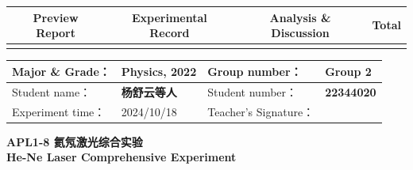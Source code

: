 


\begin{table}
	\renewcommand\arraystretch{1.7}
	\begin{tabularx}{\textwidth}{
			|X|X|X|X
			|X|X|X|X|}
		\hline
		\multicolumn{2}{|c|}{Preview Report}&\multicolumn{2}{|c|}{Experimental Record}&\multicolumn{2}{|c|}{Analysis \& Discussion}&\multicolumn{2}{|c|}{\Large\textbf{Total}}\\
		\hline
		\LARGE & & \LARGE & & \LARGE & & \LARGE & \\
		\hline
	\end{tabularx}
\end{table}


\begin{table}
	\renewcommand\arraystretch{1.7}
	\begin{tabularx}{\textwidth}{|X|X|X|X|}
		\hline
		Major \& Grade： & Physics, 2022 &Group number： & Group 2\\
		\hline
		Student name： & \textbf{杨舒云等人}  & Student number： & \textbf{22344020}\\
		\hline
		Experiment time： & 2024/10/18 & Teacher's Signature： & \\
		\hline
	\end{tabularx}
\end{table}


\begin{center}
	\huge \textbf{APL1-8 \quad 氦氖激光综合实验\\He-Ne Laser Comprehensive Experiment}
\end{center}


